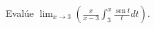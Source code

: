 \item Evalúe $\displaystyle \lim_{x \to 3} \left( \frac{x}{x - 3} \int_3^x \frac{\operatorname{sen} t}{t} dt \right)$.
